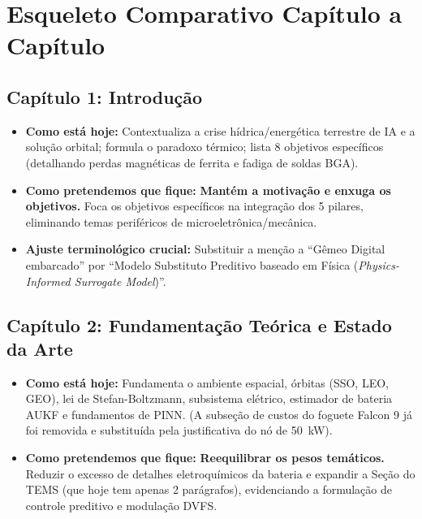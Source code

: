 \documentclass[11pt,a4paper]{article}
\begin{document}
\vspace{4pt}
\section{Esqueleto Comparativo Capítulo a Capítulo}

\subsection*{Capítulo 1: Introdução}
\begin{itemize}[leftmargin=1.2em, itemsep=2pt, parsep=0pt]
    \item \textbf{Como está hoje:} Contextualiza a crise hídrica/energética terrestre de IA e a solução orbital; formula o paradoxo térmico; lista 8 objetivos específicos (detalhando perdas magnéticas de ferrita e fadiga de soldas BGA).
    \item \textbf{Como pretendemos que fique:} \textbf{Mantém a motivação e enxuga os objetivos.} Foca os objetivos específicos na integração dos 5 pilares, eliminando temas periféricos de microeletrônica/mecânica.
    \item \textbf{Ajuste terminológico crucial:} Substituir a menção a ``Gêmeo Digital embarcado'' por ``Modelo Substituto Preditivo baseado em Física (\textit{Physics-Informed Surrogate Model})''.
\end{itemize}

\subsection*{Capítulo 2: Fundamentação Teórica e Estado da Arte}
\begin{itemize}[leftmargin=1.2em, itemsep=2pt, parsep=0pt]
    \item \textbf{Como está hoje:} Fundamenta o ambiente espacial, órbitas (SSO, LEO, GEO), lei de Stefan-Boltzmann, subsistema elétrico, estimador de bateria AUKF e fundamentos de PINN. (A subseção de custos do foguete Falcon 9 já foi removida e substituída pela justificativa do nó de 50~kW).
    \item \textbf{Como pretendemos que fique:} \textbf{Reequilibrar os pesos temáticos.} Reduzir o excesso de detalhes eletroquímicos da bateria e expandir a Seção do TEMS (que hoje tem apenas 2 parágrafos), evidenciando a formulação de controle preditivo e modulação DVFS.
\end{itemize}
\end{document}
